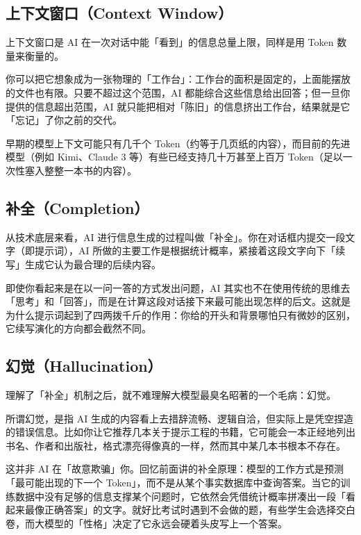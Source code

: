\subsection*{上下文窗口（Context Window）}
\label{sec:context-window}

上下文窗口是 AI 在一次对话中能「看到」的信息总量上限，同样是用 Token 数量来衡量的。

你可以把它想象成为一张物理的「工作台」：工作台的面积是固定的，上面能摆放的文件也有限。只要不超过这个范围，AI 都能综合这些信息给出回答；但一旦你提供的信息超出范围，AI 就只能把相对「陈旧」的信息挤出工作台，结果就是它「忘记」了你之前的交代。

早期的模型上下文可能只有几千个 Token（约等于几页纸的内容），而目前的先进模型（例如 Kimi、Claude 3 等）有些已经支持几十万甚至上百万 Token（足以一次性塞入整整一本书的内容）。

\subsection*{补全（Completion）}
\label{sec:completion}

从技术底层来看，AI 进行信息生成的过程叫做「补全」。你在对话框内提交一段文字（即提示词），AI 所做的主要工作是根据统计概率，紧接着这段文字向下「续写」生成它认为最合理的后续内容。

即使你看起来是在以一问一答的方式发出问题，AI 其实也不在使用传统的思维去「思考」和「回答」，而是在计算这段对话接下来最可能出现怎样的后文。这就是为什么提示词起到了四两拨千斤的作用：你给的开头和背景哪怕只有微妙的区别，它续写演化的方向都会截然不同。

\subsection*{幻觉（Hallucination）}
\label{sec:hallucination}

理解了「补全」机制之后，就不难理解大模型最臭名昭著的一个毛病：幻觉。

所谓幻觉，是指 AI 生成的内容看上去措辞流畅、逻辑自洽，但实际上是凭空捏造的错误信息。比如你让它推荐几本关于提示工程的书籍，它可能会一本正经地列出书名、作者和出版社，格式漂亮得像真的一样，然而其中某几本书根本不存在。

这并非 AI 在「故意欺骗」你。回忆前面讲的补全原理：模型的工作方式是预测「最可能出现的下一个 Token」，而不是从某个事实数据库中查询答案。当它的训练数据中没有足够的信息支撑某个问题时，它依然会凭借统计概率拼凑出一段「看起来最像正确答案」的文字。就好比考试时遇到不会做的题，有些学生会选择交白卷，而大模型的「性格」决定了它永远会硬着头皮写上一个答案。

